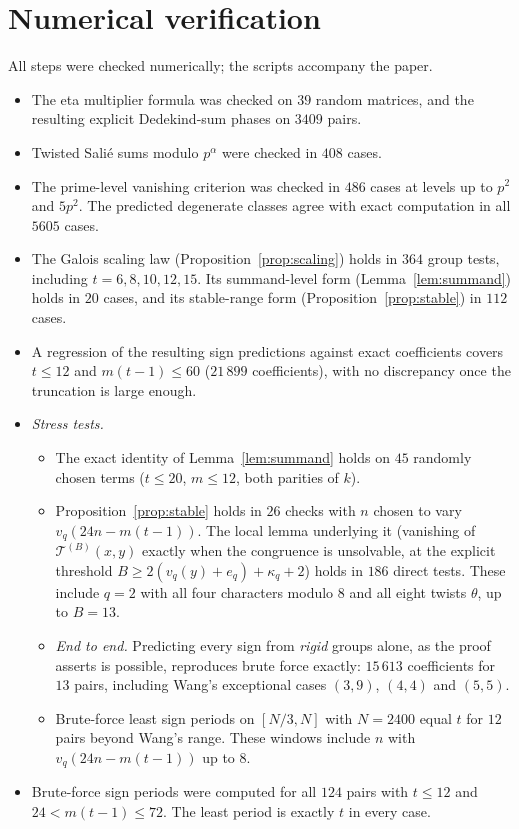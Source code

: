 \documentclass[11pt]{amsart}
\theoremstyle{definition}\newtheorem{definition}[theorem]{Definition}
\theoremstyle{remark}\newtheorem{remark}[theorem]{Remark}
\begin{document}
\section{Numerical verification}\label{sec:num}
All steps were checked numerically; the scripts accompany the paper.
\begin{itemize}[leftmargin=1.5em]
\item The eta multiplier formula was checked on $39$ random matrices, and the resulting explicit Dedekind-sum phases on $3409$ pairs.
\item Twisted Sali\'e sums modulo $p^\alpha$ were checked in $408$ cases.
\item The prime-level vanishing criterion was checked in $486$ cases at levels up to $p^2$ and $5p^2$. The predicted degenerate classes agree with exact computation in all $5605$ cases.
\item The Galois scaling law (Proposition~\ref{prop:scaling}) holds in $364$ group tests, including $t=6,8,10,12,15$. Its summand-level form (Lemma~\ref{lem:summand}) holds in $20$ cases, and its stable-range form (Proposition~\ref{prop:stable}) in $112$ cases.
\item A regression of the resulting sign predictions against exact coefficients covers $t\le12$ and $m(t-1)\le60$ ($21\,899$ coefficients), with no discrepancy once the truncation is large enough.
\item \emph{Stress tests.}
\begin{itemize}[leftmargin=1.5em]
\item The exact identity of Lemma~\ref{lem:summand} holds on $45$ randomly chosen terms ($t\le20$, $m\le12$, both parities of $k$).
\item Proposition~\ref{prop:stable} holds in $26$ checks with $n$ chosen to vary $v_q(24n-m(t-1))$. The local lemma underlying it (vanishing of $\mathcal T^{(B)}(x,y)$ exactly when the congruence is unsolvable, at the explicit threshold $B\ge2(v_q(y)+e_q)+\kappa_q+2$) holds in $186$ direct tests. These include $q=2$ with all four characters modulo $8$ and all eight twists $\theta$, up to $B=13$.
\item \emph{End to end.} Predicting every sign from \emph{rigid} groups alone, as the proof asserts is possible, reproduces brute force exactly: $15\,613$ coefficients for $13$ pairs, including Wang's exceptional cases $(3,9)$, $(4,4)$ and $(5,5)$.
\item Brute-force least sign periods on $[N/3,N]$ with $N=2400$ equal $t$ for $12$ pairs beyond Wang's range. These windows include $n$ with $v_q(24n-m(t-1))$ up to $8$.
\end{itemize}
\item Brute-force sign periods were computed for all $124$ pairs with $t\le12$ and $24<m(t-1)\le72$. The least period is exactly $t$ in every case.
\end{itemize}
\end{document}
